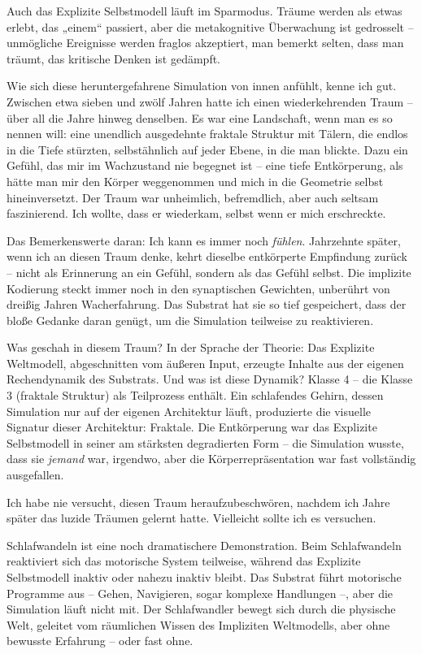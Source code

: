 \documentclass[11pt, twoside, openright]{book}
\begin{document}
Auch das Explizite Selbstmodell läuft im Sparmodus. Träume werden als etwas erlebt, das „einem“ passiert, aber die metakognitive Überwachung ist gedrosselt -- unmögliche Ereignisse werden fraglos akzeptiert, man bemerkt selten, dass man träumt, das kritische Denken ist gedämpft.

Wie sich diese heruntergefahrene Simulation von innen anfühlt, kenne ich gut. Zwischen etwa sieben und zwölf Jahren hatte ich einen wiederkehrenden Traum -- über all die Jahre hinweg denselben. Es war eine Landschaft, wenn man es so nennen will: eine unendlich ausgedehnte fraktale Struktur mit Tälern, die endlos in die Tiefe stürzten, selbstähnlich auf jeder Ebene, in die man blickte. Dazu ein Gefühl, das mir im Wachzustand nie begegnet ist -- eine tiefe Entkörperung, als hätte man mir den Körper weggenommen und mich in die Geometrie selbst hineinversetzt. Der Traum war unheimlich, befremdlich, aber auch seltsam faszinierend. Ich wollte, dass er wiederkam, selbst wenn er mich erschreckte.

Das Bemerkenswerte daran: Ich kann es immer noch \textit{fühlen}. Jahrzehnte später, wenn ich an diesen Traum denke, kehrt dieselbe entkörperte Empfindung zurück -- nicht als Erinnerung an ein Gefühl, sondern als das Gefühl selbst. Die implizite Kodierung steckt immer noch in den synaptischen Gewichten, unberührt von dreißig Jahren Wacherfahrung. Das Substrat hat sie so tief gespeichert, dass der bloße Gedanke daran genügt, um die Simulation teilweise zu reaktivieren.

Was geschah in diesem Traum? In der Sprache der Theorie: Das Explizite Weltmodell, abgeschnitten vom äußeren Input, erzeugte Inhalte aus der eigenen Rechendynamik des Substrats. Und was ist diese Dynamik? Klasse 4 -- die Klasse 3 (fraktale Struktur) als Teilprozess enthält. Ein schlafendes Gehirn, dessen Simulation nur auf der eigenen Architektur läuft, produzierte die visuelle Signatur dieser Architektur: Fraktale. Die Entkörperung war das Explizite Selbstmodell in seiner am stärksten degradierten Form -- die Simulation wusste, dass sie \textit{jemand} war, irgendwo, aber die Körperrepräsentation war fast vollständig ausgefallen.

Ich habe nie versucht, diesen Traum heraufzubeschwören, nachdem ich Jahre später das luzide Träumen gelernt hatte. Vielleicht sollte ich es versuchen.

Schlafwandeln ist eine noch dramatischere Demonstration. Beim Schlafwandeln reaktiviert sich das motorische System teilweise, während das Explizite Selbstmodell inaktiv oder nahezu inaktiv bleibt. Das Substrat führt motorische Programme aus -- Gehen, Navigieren, sogar komplexe Handlungen --, aber die Simulation läuft nicht mit. Der Schlafwandler bewegt sich durch die physische Welt, geleitet vom räumlichen Wissen des Impliziten Weltmodells, aber ohne bewusste Erfahrung -- oder fast ohne.
\end{document}

